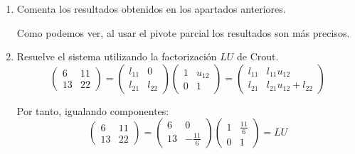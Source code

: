 \begin{ejercicio}
\begin{enumerate}
        \item Comenta los resultados obtenidos en los apartados anteriores.

        Como podemos ver, al usar el pivote parcial los resultados son más precisos.

        \item Resuelve el sistema utilizando la factorización $LU$ de Crout.
        \begin{equation*}
            \left(\begin{array}{cc}
            6 & 11\\
            13 & 22
            \end{array}\right) =
            \left(\begin{array}{cc}
            l_{11} & 0\\
            l_{21} & l_{22}
            \end{array}\right)
            \left(\begin{array}{cc}
            1 & u_{12}\\
            0 & 1
            \end{array}\right) = 
            \left(\begin{array}{cc}
            l_{11} & l_{11}u_{12}\\
            l_{21} & l_{21}u_{12} + l_{22}
            \end{array}\right)
        \end{equation*}

        Por tanto, igualando componentes:
        \begin{equation*}
            \left(\begin{array}{cc}
            6 & 11\\
            13 & 22
            \end{array}\right) =
            \left(\begin{array}{cc}
            6 & 0\\
            13 & -\frac{11}{6}
            \end{array}\right)
            \left(\begin{array}{cc}
            1 & \frac{11}{6}\\
            0 & 1
            \end{array}\right) = LU
        \end{equation*}


\end{enumerate}
\end{ejercicio}
